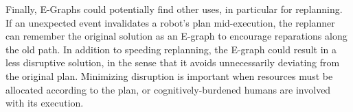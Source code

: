 \documentclass[letterpaper]{article}
\begin{document}
Finally, E-Graphs could potentially find other uses, in particular for replanning. If an unexpected event invalidates a robot's plan mid-execution, the replanner can remember the original solution as an E-graph to encourage reparations along the old path. In addition to speeding replanning, the E-graph could result in a less disruptive solution, in the sense that it avoids unnecessarily deviating from the original plan. Minimizing disruption is important when resources must be allocated according to the plan, or cognitively-burdened humans are involved with its execution.



\end{document}
